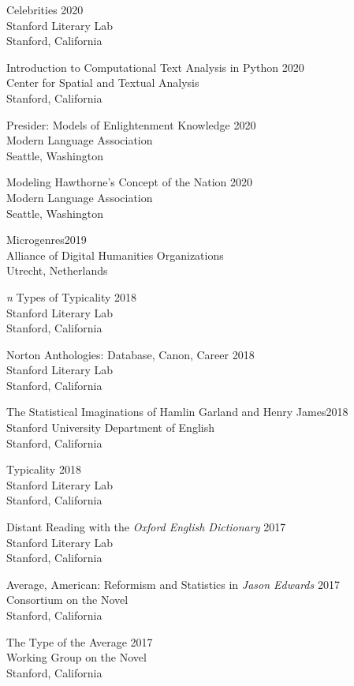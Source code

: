 \documentclass[
  12pt,
  letterpaper,
]{article}
\begin{document}
Celebrities \hfill 2020\\
Stanford Literary Lab\\
Stanford, California

Introduction to Computational Text Analysis in Python \hfill 2020\\
Center for Spatial and Textual Analysis\\
Stanford, California

Presider: Models of Enlightenment Knowledge \hfill 2020\\
Modern Language Association\\
Seattle, Washington

Modeling Hawthorne's Concept of the Nation \hfill 2020\\
Modern Language Association\\
Seattle, Washington

Microgenres\hfill 2019\\
Alliance of Digital Humanities Organizations\\
Utrecht, Netherlands

\emph{n} Types of Typicality \hfill 2018\\
Stanford Literary Lab\\
Stanford, California

Norton Anthologies: Database, Canon, Career \hfill 2018\\
Stanford Literary Lab\\
Stanford, California

The Statistical Imaginations of Hamlin Garland and Henry
James\hfill 2018\\
Stanford University Department of English\\
Stanford, California

Typicality \hfill 2018\\
Stanford Literary Lab\\
Stanford, California

Distant Reading with the \emph{Oxford English Dictionary} \hfill 2017\\
Stanford Literary Lab\\
Stanford, California

Average, American: Reformism and Statistics in \emph{Jason Edwards}
\hfill 2017\\
Consortium on the Novel\\
Stanford, California

The Type of the Average \hfill 2017\\
Working Group on the Novel\\
Stanford, California
\end{document}

